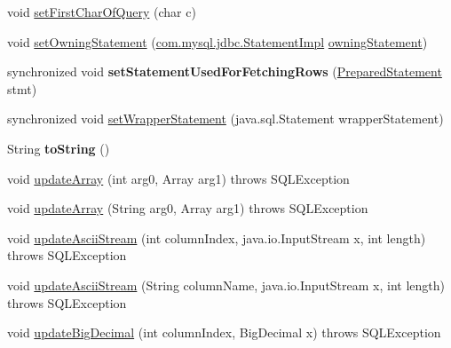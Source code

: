 \begin{DoxyCompactItemize}
void \mbox{\hyperlink{classcom_1_1mysql_1_1jdbc_1_1_result_set_impl_af4fe74c27ee2030bc12bc629f57f944f}{set\+First\+Char\+Of\+Query}} (char c)
\item 
void \mbox{\hyperlink{classcom_1_1mysql_1_1jdbc_1_1_result_set_impl_ac318c564fa48174a78268750b91bac73}{set\+Owning\+Statement}} (\mbox{\hyperlink{classcom_1_1mysql_1_1jdbc_1_1_statement_impl}{com.\+mysql.\+jdbc.\+Statement\+Impl}} \mbox{\hyperlink{classcom_1_1mysql_1_1jdbc_1_1_result_set_impl_af63a4e083b31643e2850c129d31bf03d}{owning\+Statement}})
\item 
\mbox{\label{classcom_1_1mysql_1_1jdbc_1_1_result_set_impl_ad28a2629d7f5da0f5005fe9a5695ab91}} 
synchronized void {\bfseries set\+Statement\+Used\+For\+Fetching\+Rows} (\mbox{\hyperlink{classcom_1_1mysql_1_1jdbc_1_1_prepared_statement}{Prepared\+Statement}} stmt)
\item 
synchronized void \mbox{\hyperlink{classcom_1_1mysql_1_1jdbc_1_1_result_set_impl_af945ea2fe5463f6d71b3af855fcf9dd5}{set\+Wrapper\+Statement}} (java.\+sql.\+Statement wrapper\+Statement)
\item 
\mbox{\label{classcom_1_1mysql_1_1jdbc_1_1_result_set_impl_ac8fffa5015373806c270e9e65942e9da}} 
String {\bfseries to\+String} ()
\item 
void \mbox{\hyperlink{classcom_1_1mysql_1_1jdbc_1_1_result_set_impl_a0661c3eec2182123467ad3461928515c}{update\+Array}} (int arg0, Array arg1)  throws S\+Q\+L\+Exception 
\item 
void \mbox{\hyperlink{classcom_1_1mysql_1_1jdbc_1_1_result_set_impl_ac90a5310bf41f46bb61af696f0db1cfc}{update\+Array}} (String arg0, Array arg1)  throws S\+Q\+L\+Exception 
\item 
void \mbox{\hyperlink{classcom_1_1mysql_1_1jdbc_1_1_result_set_impl_a7d210c70de89ca540597a70d1f9f086a}{update\+Ascii\+Stream}} (int column\+Index, java.\+io.\+Input\+Stream x, int length)  throws S\+Q\+L\+Exception 
\item 
void \mbox{\hyperlink{classcom_1_1mysql_1_1jdbc_1_1_result_set_impl_a97dbbc5acdf00d59af6cba16b4f8b7e6}{update\+Ascii\+Stream}} (String column\+Name, java.\+io.\+Input\+Stream x, int length)  throws S\+Q\+L\+Exception 
\item 
void \mbox{\hyperlink{classcom_1_1mysql_1_1jdbc_1_1_result_set_impl_a36e44642a8dd4749f1ee694183c4b07f}{update\+Big\+Decimal}} (int column\+Index, Big\+Decimal x)  throws S\+Q\+L\+Exception 

\end{DoxyCompactItemize}

